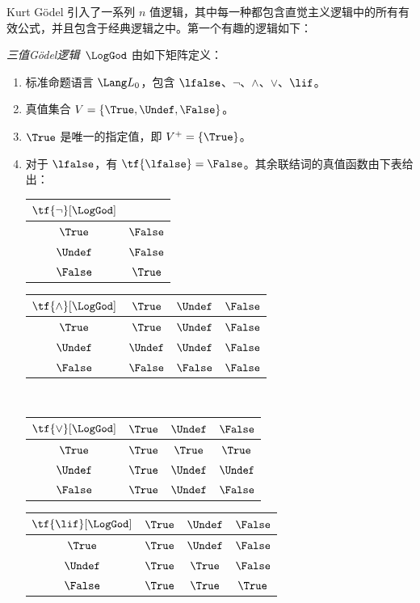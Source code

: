 \documentclass[../../../include/open-logic-section]{subfiles}
\begin{document}


Kurt Gödel 引入了一系列 $n$ 值逻辑，其中每一种都包含直觉主义逻辑中的所有有效公式，并且包含于经典逻辑之中。第一个有趣的逻辑如下：

\begin{defn}
\emph{三值Gödel逻辑}~$\LogGod$ 由如下矩阵定义：
\begin{enumerate}
  \item 标准命题语言 $\Lang L_0$，包含
  $\lfalse$、$\lnot$、$\land$、$\lor$、$\lif$。
  \item 真值集合 $V = \{\True, \Undef, \False\}$。
  \item $\True$ 是唯一的指定值，即 $V^+ = \{\True\}$。
  \item 对于 $\lfalse$，有 $\tf{\lfalse} = \False$。其余联结词的真值函数由下表给出：
  \begin{center}
    \begin{tabular}{c|c}
      $\tf{\lnot}[\LogGod]$ & \\
      \hline
      $\True$ & $\False$ \\
      $\Undef$ & $\False$ \\
      $\False$ & $\True$
    \end{tabular}
    \quad
    \begin{tabular}{c|ccc}
      $\tf{\land}[\LogGod]$ & $\True$ & $\Undef$ & $\False$ \\
      \hline
      $\True$ & $\True$ & $\Undef$ & $\False$ \\
      $\Undef$ & $\Undef$ & $\Undef$ & $\False$\\
      $\False$ & $\False$ & $\False$ & $\False$
    \end{tabular}
    \\[2ex]
    \begin{tabular}{c|ccc}
      $\tf{\lor}[\LogGod]$ & $\True$ & $\Undef$ & $\False$ \\
      \hline
      $\True$ & $\True$ & $\True$ & $\True$ \\
      $\Undef$ & $\True$ & $\Undef$ & $\Undef$ \\
      $\False$ & $\True$ & $\Undef$ & $\False$
    \end{tabular}
    \quad
    \begin{tabular}{c|ccc}
      $\tf{\lif}[\LogGod]$ & $\True$ & $\Undef$ & $\False$ \\
      \hline
      $\True$ & $\True$ & $\Undef$ & $\False$ \\
      $\Undef$ & $\True$ & $\True$ & $\False$  \\
      $\False$ & $\True$ & $\True$ & $\True$
    \end{tabular}
  \end{center}
\end{enumerate}
\end{defn}
\end{document}
